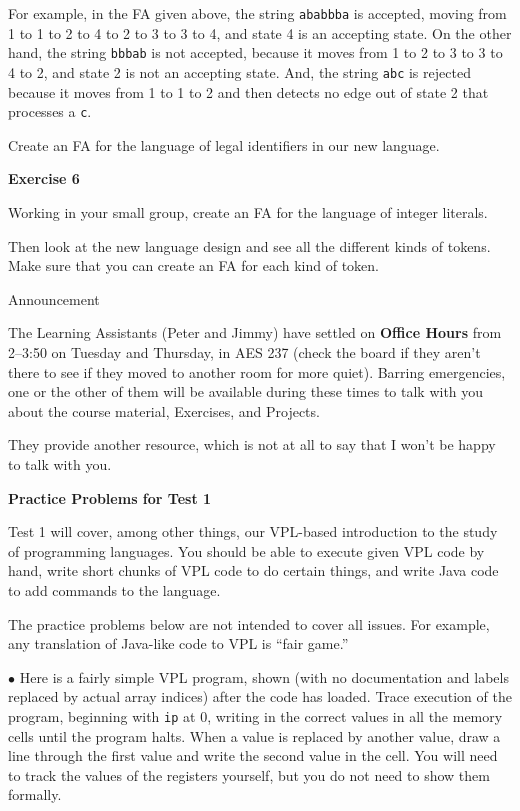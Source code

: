 For example, in the FA given above, the string {\tt ababbba} is accepted, moving from
1 to 1 to 2 to 4 to 2 to 3 to 3 to 4, and state 4 is an accepting state.  On the other hand,
the string {\tt bbbab} is not accepted, because it moves from 1 to 2 to 3 to 3 to 4 to 2,
and state 2 is not an accepting state.  And, the string {\tt abc} is rejected because it moves
from 1 to 1 to 2 and then detects no edge out of state 2 that processes a {\tt c}.
\bigskip

\doit Create an FA for the language of legal identifiers in our new language.
\border

{\bf Exercise 6}
\medskip

Working in your small group, create an FA for the language of integer literals.
\medskip

Then look at the new language design and see all the different kinds of tokens.
Make sure that you can create an FA for each kind of token.
\border

\vfil\eject

{\bigboldfont Announcement}
\medskip

The Learning Assistants (Peter and Jimmy) have settled on {\bf Office Hours} from
2--3:50 on Tuesday and Thursday, in AES 237 (check the board if they aren't there to see if
they moved to another room for more quiet).
Barring emergencies, one or the other of them will be available during these times
to talk with you about the
course material, Exercises, and Projects.
\medskip

They provide another resource, which is
 not at all to say that I won't be happy to talk with you.
\border

{\bf Practice Problems for Test 1}
\medskip

Test 1 will cover, among other things,
our VPL-based introduction to the study of programming languages.
You should be able to execute given VPL code by hand, write short chunks of VPL code to
do certain things, and write Java code to add commands to the language.
\medskip

The practice problems below are not intended to cover all issues.  For example, any
translation of Java-like code to VPL is ``fair game.''
\border

\item{$\bullet$}
Here is a fairly simple VPL program, shown (with no documentation and labels
replaced by actual array indices) after the code has loaded.  Trace execution of the program,
beginning with {\tt ip} at 0,
writing in the correct values in all the memory cells until the program halts.
When a value is replaced by another value, draw a line through the first value and write
the second value in the cell.  You will need to track the values of the registers yourself,
but you do not need to show them formally.
\medskip

